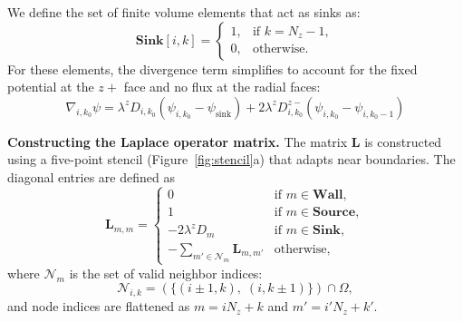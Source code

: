 \documentclass[10pt, a4paper, twocolumn]{article}
\begin{document}
We define the set of finite volume elements that act as sinks as:
\begin{equation}
    \textbf{Sink}[i,k] =
    \begin{cases}
    1, & \text{if } k = N_z - 1, \\
    0, & \text{otherwise}.
    \end{cases}
\end{equation}
For these elements, the divergence term simplifies to account for the fixed potential at the $z+$ face and no flux at the radial faces:
\begin{equation}
    \nabla_{i,k_0} \psi =
    \lambda^{z} D_{i,k_0} (\psi_{i,k_0} - \psi_{\text{sink}})
    + 2 \lambda^{z} D_{i,k_0}^{z-} (\psi_{i,k_0} - \psi_{i,k_0-1})
\end{equation}

\bigskip\noindent
\textbf{Constructing the Laplace operator matrix.}
The matrix $\mathbf{L}$ is constructed using a five-point stencil (Figure~\ref{fig:stencil}a) that adapts near boundaries.
The diagonal entries are defined as
\begin{equation}
  \bm{L}_{m,m} = 
  \begin{cases}
    0 & \text{if } m \in \textbf{Wall}, \\
    1 & \text{if } m \in \textbf{Source}, \\
    - 2 \lambda^{z} D_m & \text{if } m \in \textbf{Sink}, \\
    -\!\!\!\sum\limits_{m' \in \mathcal{N}_m} \bm{L}_{m, m'} & \text{otherwise},
  \end{cases}
  \label{eq:L_diag}
\end{equation}
where $\mathcal{N}_m$ is the set of valid neighbor indices:
\begin{equation}
  \mathcal{N}_{i,k} = \left( \{(i \pm 1, k),\; (i, k \pm 1)\} \right) \cap \Omega,
  \label{eq:neighbors}
\end{equation}
and node indices are flattened as $m = i N_z + k$ and $m' = i' N_z + k'$.
\end{document}
